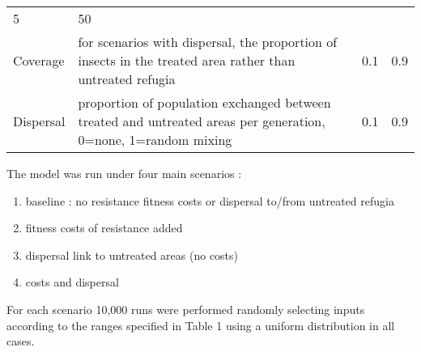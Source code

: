 \documentclass[11pt,]{article}
\providecommand{\tightlist}{%
  \setlength{\itemsep}{0pt}\setlength{\parskip}{0pt}}
\begin{document}
\begin{longtable}[]{@{}llll@{}}
\begin{minipage}[t]{0.07\columnwidth}
5\strut
\end{minipage} & \begin{minipage}[t]{0.07\columnwidth}\raggedright\strut
50\strut
\end{minipage}\tabularnewline
\begin{minipage}[t]{0.28\columnwidth}\raggedright\strut
Coverage\strut
\end{minipage} & \begin{minipage}[t]{0.46\columnwidth}\raggedright\strut
for scenarios with dispersal, the proportion of insects in the treated
area rather than untreated refugia\strut
\end{minipage} & \begin{minipage}[t]{0.07\columnwidth}\raggedright\strut
0.1\strut
\end{minipage} & \begin{minipage}[t]{0.07\columnwidth}\raggedright\strut
0.9\strut
\end{minipage}\tabularnewline
\begin{minipage}[t]{0.28\columnwidth}\raggedright\strut
Dispersal\strut
\end{minipage} & \begin{minipage}[t]{0.46\columnwidth}\raggedright\strut
proportion of population exchanged between treated and untreated areas
per generation, 0=none, 1=random mixing\strut
\end{minipage} & \begin{minipage}[t]{0.07\columnwidth}\raggedright\strut
0.1\strut
\end{minipage} & \begin{minipage}[t]{0.07\columnwidth}\raggedright\strut
0.9\strut
\end{minipage}\tabularnewline
\bottomrule
\end{longtable}

The model was run under four main scenarios :

\begin{enumerate}
\def\labelenumi{\arabic{enumi}.}
\tightlist
\item
  baseline : no resistance fitness costs or dispersal to/from untreated
  refugia
\item
  fitness costs of resistance added
\item
  dispersal link to untreated areas (no costs)
\item
  costs and dispersal
\end{enumerate}

For each scenario 10,000 runs were performed randomly selecting inputs
according to the ranges specified in Table 1 using a uniform
distribution in all cases.
\end{document}
